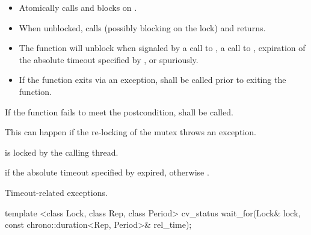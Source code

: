 \begin{itemdescr}
\pnum\effects

\begin{itemize}
\item
Atomically calls  and blocks on .

\item
When unblocked, calls  (possibly blocking on the lock) and returns.

\item
The function will unblock when signaled by a call to , a call to ,
expiration of the absolute timeout specified by ,
or spuriously.

\item
If the function exits via an exception,  shall be called prior to exiting the function.
\end{itemize}

\pnum
\remarks
If the function fails to meet the postcondition, 
shall be called.
\begin{note} This can happen if the re-locking of the mutex throws an exception. \end{note}

\pnum
\postconditions {} is locked by the calling thread.

\pnum
\returns {} if
the absolute timeout specified by  expired,
otherwise .

\pnum
\throws Timeout-related
exceptions.

\end{itemdescr}

%
\begin{itemdecl}
template <class Lock, class Rep, class Period>
  cv_status wait_for(Lock& lock, const chrono::duration<Rep, Period>& rel_time);
\end{itemdecl}

